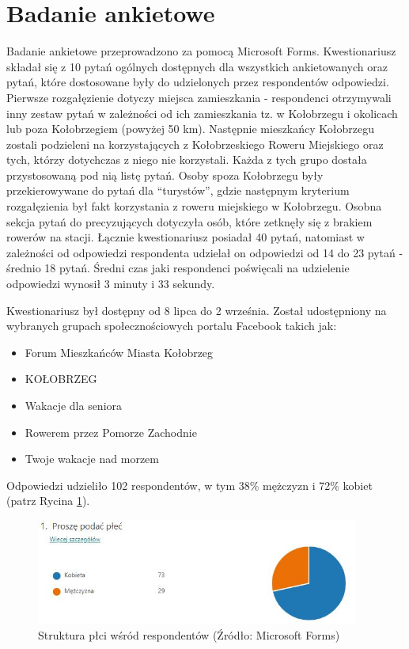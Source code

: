 \documentclass{amuthesis}
\begin{document}
\hypertarget{ankieta}{%
\section{Badanie ankietowe}\label{ankieta}}

Badanie ankietowe przeprowadzono za pomocą Microsoft Forms.
Kwestionariusz składał się z 10 pytań ogólnych dostępnych dla wszystkich ankietowanych oraz pytań, które dostosowane były do udzielonych przez respondentów odpowiedzi.
Pierwsze rozgałęzienie dotyczy miejsca zamieszkania - respondenci otrzymywali inny zestaw pytań w zależności od ich zamieszkania tz. w Kołobrzegu i okolicach lub poza Kołobrzegiem (powyżej 50 km).
Następnie mieszkańcy Kołobrzegu zostali podzieleni na korzystających z Kołobrzeskiego Roweru Miejskiego oraz tych, którzy dotychczas z niego nie korzystali.
Każda z tych grupo dostała przystosowaną pod nią listę pytań.
Osoby spoza Kołobrzegu były przekierowywane do pytań dla ``turystów'', gdzie następnym kryterium rozgałęzienia był fakt korzystania z roweru miejskiego w Kołobrzegu.
Osobna sekcja pytań do precyzujących dotyczyła osób, które zetknęły się z brakiem rowerów na stacji.
Łącznie kwestionariusz posiadał 40 pytań, natomiast w zależności od odpowiedzi respondenta udzielał on odpowiedzi od 14 do 23 pytań - średnio 18 pytań.
Średni czas jaki respondenci poświęcali na udzielenie odpowiedzi wynosił 3 minuty i 33 sekundy.

Kwestionariusz był dostępny od 8 lipca do 2 września.
Został udostępniony na wybranych grupach społecznościowych portalu Facebook takich jak:

\begin{itemize}
\item
  Forum Mieszkańców Miasta Kołobrzeg
\item
  KOŁOBRZEG
\item
  Wakacje dla seniora
\item
  Rowerem przez Pomorze Zachodnie
\item
  Twoje wakacje nad morzem
\end{itemize}

Odpowiedzi udzieliło 102 respondentów, w tym 38\% mężczyzn i 72\% kobiet (patrz Rycina \ref{fig:ankieta1}).

\begin{figure}[t]

{\centering \includegraphics[width=400px]{figures/ankieta/1} 

}

\caption{Struktura płci wśród respondentów (Źródło: Microsoft Forms)}\label{fig:ankieta1}
\end{figure}
\end{document}
